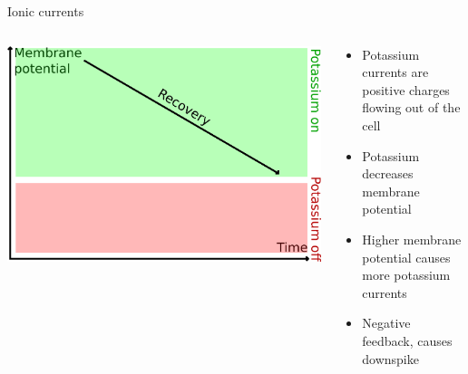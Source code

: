 \documentclass[presentation]{beamer}
\begin{document}
\begin{frame}[label={sec:org7cffb65}]{Ionic currents}
\begin{columns}
\begin{column}{0.5\columnwidth}
\begin{center}
\includegraphics[width=.9\linewidth]{./slowpotassium.png}
\end{center}
\end{column}

\begin{column}{0.5\columnwidth}
\begin{itemize}
\item Potassium currents are positive charges flowing out of the cell
\item Potassium decreases membrane potential
\item Higher membrane potential causes more potassium currents
\item Negative feedback, causes downspike
\end{itemize}
\end{column}
\end{columns}
\end{frame}
\end{document}
